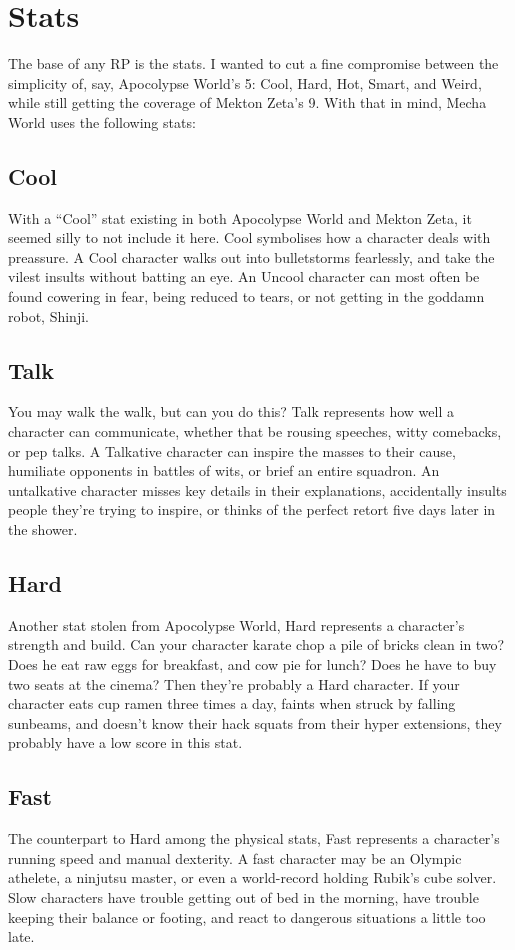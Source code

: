 \section{Stats}
The base of any RP is the stats. I wanted to cut a fine compromise between the simplicity of, say, Apocolypse World's 5: Cool, Hard, Hot, Smart, and Weird, while still getting the coverage of Mekton Zeta's 9. With that in mind, Mecha World uses the following stats:

\subsection{Cool}
With a ``Cool'' stat existing in both Apocolypse World and Mekton Zeta, it seemed silly to not include it here. Cool symbolises how a character deals with preassure. A Cool character walks out into bulletstorms fearlessly, and take the vilest insults without batting an eye. An Uncool character can most often be found cowering in fear, being reduced to tears, or not getting in the goddamn robot, Shinji.
 
\subsection{Talk}
You may walk the walk, but can you do this? Talk represents how well a character can communicate, whether that be rousing speeches, witty comebacks, or pep talks. A Talkative character can inspire the masses to their cause, humiliate opponents in battles of wits, or brief an entire squadron. An untalkative character misses key details in their explanations, accidentally insults people they're trying to inspire, or thinks of the perfect retort five days later in the shower.

\subsection{Hard}
Another stat stolen from Apocolypse World, Hard represents a character's strength and build. Can your character karate chop a pile of bricks clean in two? Does he eat raw eggs for breakfast, and cow pie for lunch? Does he have to buy two seats at the cinema? Then they're probably a Hard character. If your character eats cup ramen three times a day, faints when struck by falling sunbeams, and doesn't know their hack squats from their hyper extensions, they probably have a low score in this stat.

\subsection{Fast}
The counterpart to Hard among the physical stats, Fast represents a character's running speed and manual dexterity. A fast character may be an Olympic athelete, a ninjutsu master, or even a world-record holding Rubik's cube solver. Slow characters have trouble getting out of bed in the morning, have trouble keeping their balance or footing, and react to dangerous situations a little too late.

